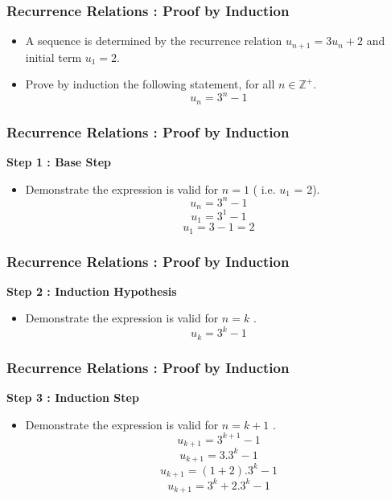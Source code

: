 \documentclass{beamer}
\begin{document}
\begin{frame}
\frametitle{Recurrence Relations : Proof by Induction}
\Large
\vspace{-1cm}
\begin{itemize}
\item A sequence is determined by the recurrence relation $u_{n+1} = 3u_n+2$ and initial term $u_1 =2$.
\item Prove by induction the following statement, for all $n \in \mathbb{Z^{+}}$.
\[ u_n=3^n-1\]
\end{itemize}
\end{frame}
\begin{frame}
\frametitle{Recurrence Relations : Proof by Induction}
\Large
\vspace{-1cm}
\textbf{Step 1 : Base Step}
\begin{itemize}
\item Demonstrate the expression is valid for $n=1$ ( i.e. $u_1$ = 2).
\[ u_n=3^n-1  \]
\[ u_1=3^1-1 \]
\[ u_1=3 -1 = 2 \]
\end{itemize}
\end{frame}
\begin{frame}
\frametitle{Recurrence Relations : Proof by Induction}
\Large
\vspace{-1cm}
\textbf{Step 2 : Induction Hypothesis}
\begin{itemize}
\item Demonstrate the expression is valid for $n=k$ .
\[ u_k=3^k-1 \]

\end{itemize}
\end{frame}
\begin{frame}
\frametitle{Recurrence Relations : Proof by Induction}
\Large
\vspace{-1cm}
\textbf{Step 3 : Induction Step}
\begin{itemize}
\item Demonstrate the expression is valid for $n=k+1$ .
\[ u_{k+1}=3^{k+1}-1 \]
\[ u_{k+1}=3.3^{k}-1 \]
\[ u_{k+1}=(1+2).3^{k}-1 \]
\[ u_{k+1}=3^{k} + 2.3^{k}-1 \]
\end{itemize}
\end{frame}
\end{document}
